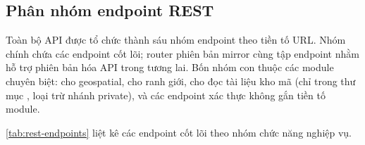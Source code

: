 \subsection{Phân nhóm endpoint REST}
\label{sec:rest-grouping}

Toàn bộ API được tổ chức thành sáu nhóm endpoint theo tiền tố URL. Nhóm chính  chứa các endpoint cốt lõi; router phiên bản  mirror cùng tập endpoint nhằm hỗ trợ phiên bản hóa API trong tương lai. Bốn nhóm con thuộc các module chuyên biệt:  cho geospatial,  cho ranh giới,  cho đọc tài liệu kho mã (chỉ trong thư mục , loại trừ nhánh private), và các endpoint xác thực không gắn tiền tố module.

\cref{tab:rest-endpoints} liệt kê các endpoint cốt lõi theo nhóm chức năng nghiệp vụ.

